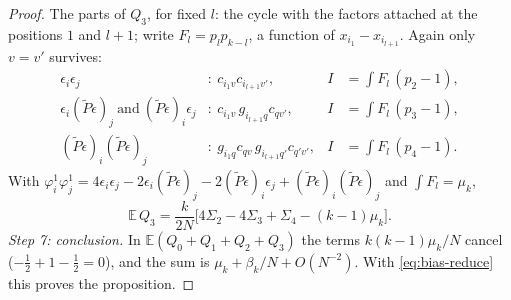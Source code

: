 \begin{proof}
\noindent The parts of $Q_3$, for fixed $l$: the cycle with the factors attached at the positions $1$ and $l+1$; write $F_l=p_lp_{k-l}$, a function of $x_{i_1}-x_{i_{l+1}}$. Again only $v=v'$ survives:
\begin{align*}
\epsilon_i\epsilon_j&:\ c_{i_1v}c_{i_{l+1}v'},&I&=\textstyle\int F_l\,(p_2-1),\\
\epsilon_i(\tilde P\epsilon)_j\ \text{and}\ (\tilde P\epsilon)_i\epsilon_j&:\ c_{i_1v}\,g_{i_{l+1}q}c_{qv'},&I&=\textstyle\int F_l\,(p_3-1),\\
(\tilde P\epsilon)_i(\tilde P\epsilon)_j&:\ g_{i_1q}c_{qv}\,g_{i_{l+1}q'}c_{q'v'},&I&=\textstyle\int F_l\,(p_4-1).
\end{align*}
With $\varphi^1_i\varphi^1_j=4\epsilon_i\epsilon_j-2\epsilon_i(\tilde P\epsilon)_j-2(\tilde P\epsilon)_i\epsilon_j+(\tilde P\epsilon)_i(\tilde P\epsilon)_j$ and $\int F_l=\mu_k$,
\[
\mathbb E\,Q_3=\frac k{2N}\Big[4\Sigma_2-4\Sigma_3+\Sigma_4-(k-1)\mu_k\Big].
\]
\emph{Step 7: conclusion.} In $\mathbb E(Q_0+Q_1+Q_2+Q_3)$ the terms $k(k-1)\mu_k/N$ cancel ($-\frac12+1-\frac12=0$), and the sum is $\mu_k+\beta_k/N+O(N^{-2})$. With \eqref{eq:bias-reduce} this proves the proposition.
\end{proof}

